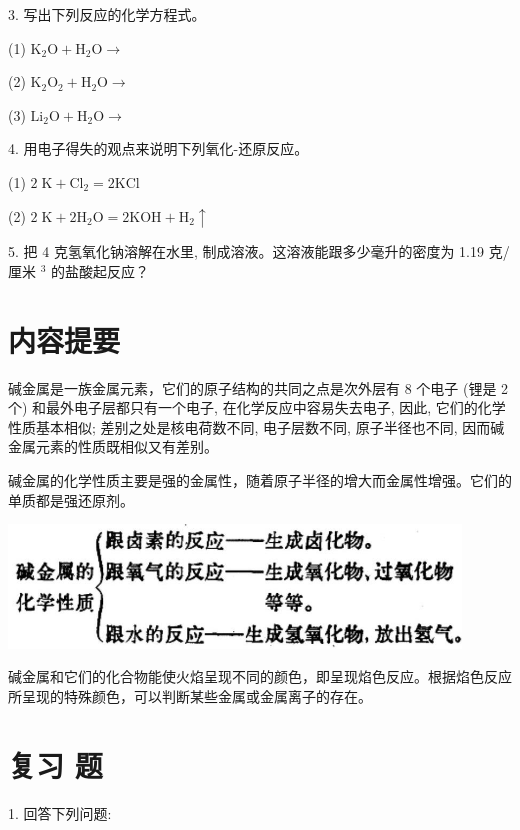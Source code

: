 \documentclass[10pt]{article}
\begin{document}
3. 写出下列反应的化学方程式。

(1) \({\mathrm{K}}_{2}\mathrm{O} + {\mathrm{H}}_{2}\mathrm{O} \rightarrow\)

(2) \({\mathrm{K}}_{2}{\mathrm{O}}_{2} + {\mathrm{H}}_{2}\mathrm{O} \rightarrow\)

(3) \({\mathrm{{Li}}}_{2}\mathrm{O} + {\mathrm{H}}_{2}\mathrm{O} \rightarrow\)

4. 用电子得失的观点来说明下列氧化-还原反应。

(1) \(2\mathrm{\;K} + {\mathrm{{Cl}}}_{2} = 2\mathrm{{KCl}}\)

(2) \(2\mathrm{\;K} + 2{\mathrm{H}}_{2}\mathrm{O} = 2\mathrm{{KOH}} + {\mathrm{H}}_{2} \uparrow\)

5. 把 4 克氢氧化钠溶解在水里, 制成溶液。这溶液能跟多少毫升的密度为 1.19 克/厘米 \({}^{3}\) 的盐酸起反应？

\section*{内容提要}

碱金属是一族金属元素，它们的原子结构的共同之点是次外层有 8 个电子 (锂是 2 个) 和最外电子层都只有一个电子, 在化学反应中容易失去电子, 因此, 它们的化学性质基本相似; 差别之处是核电荷数不同, 电子层数不同, 原子半径也不同, 因而碱金属元素的性质既相似又有差别。

碱金属的化学性质主要是强的金属性，随着原子半径的增大而金属性增强。它们的单质都是强还原剂。

\begin{center}
\includegraphics[max width=0.9\textwidth]{images/01912d0f-097c-7e75-8f32-4f326cd86c9f_101_648391.jpg}
\end{center}

碱金属和它们的化合物能使火焰呈现不同的颜色，即呈现焰色反应。根据焰色反应所呈现的特殊颜色，可以判断某些金属或金属离子的存在。

\section*{复习 题}

1. 回答下列问题:
\end{document}
